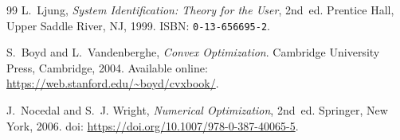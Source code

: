 \documentclass[a4paper,12pt]{article}
\begin{document}
\begin{thebibliography}{99}
L.~Ljung,
\textit{System Identification: Theory for the User},
2nd~ed.
Prentice Hall,
Upper Saddle River, NJ,
1999.
ISBN:
\texttt{0-13-656695-2}.

S.~Boyd and L.~Vandenberghe,
\textit{Convex Optimization}.
Cambridge University Press,
Cambridge,
2004.
Available online:
\url{https://web.stanford.edu/~boyd/cvxbook/}.

J.~Nocedal and S.~J. Wright,
\textit{Numerical Optimization},
2nd~ed.
Springer,
New York,
2006.
doi:
\url{https://doi.org/10.1007/978-0-387-40065-5}.

\end{thebibliography}
\end{document}
